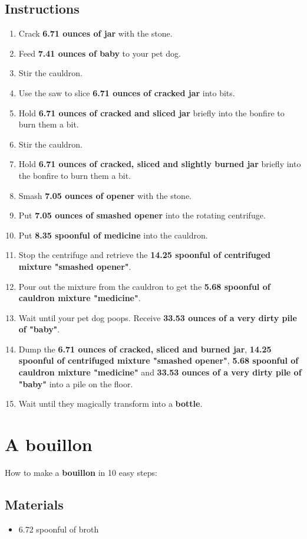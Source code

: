 \documentclass{article}
\begin{document}
\subsection{Instructions}\begin{enumerate}
\item 
Crack \textbf{6.71 ounces of jar} with the stone.
\item 
Feed \textbf{7.41 ounces of baby} to your pet dog.
\item 
Stir the cauldron.
\item 
Use the saw to slice \textbf{6.71 ounces of cracked jar} into bits.
\item 
Hold \textbf{6.71 ounces of cracked and sliced jar} briefly into the bonfire to burn them a bit.
\item 
Stir the cauldron.
\item 
Hold \textbf{6.71 ounces of cracked, sliced and slightly burned jar} briefly into the bonfire to burn them a bit.
\item 
Smash \textbf{7.05 ounces of opener} with the stone.
\item 
Put \textbf{7.05 ounces of smashed opener} into the rotating centrifuge.
\item 
Put \textbf{8.35 spoonful of medicine} into the cauldron.
\item 
Stop the centrifuge and retrieve the \textbf{14.25 spoonful of centrifuged mixture "smashed opener"}.
\item 
Pour out the mixture from the cauldron to get the \textbf{5.68 spoonful of cauldron mixture "medicine"}.
\item 
Wait until your pet dog poops. Receive \textbf{33.53 ounces of a very dirty pile of "baby"}.
\item 
Dump the \textbf{6.71 ounces of cracked, sliced and burned jar}, \textbf{14.25 spoonful of centrifuged mixture "smashed opener"}, \textbf{5.68 spoonful of cauldron mixture "medicine"} and \textbf{33.53 ounces of a very dirty pile of "baby"} into a pile on the floor.
\item 
Wait until they magically transform into a \textbf{bottle}.
\end{enumerate}
\newpage
\section{A bouillon}How to make a \textbf{bouillon} in 10 easy steps:

\subsection{Materials}\begin{itemize}
\item 
6.72 spoonful of broth
\end{itemize}
\end{document}
